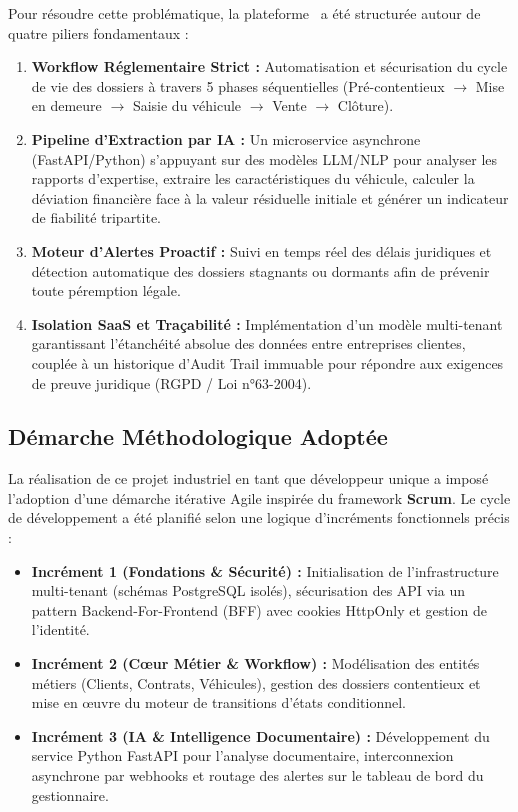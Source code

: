 Pour résoudre cette problématique, la plateforme \projectShortTitle\ a été structurée autour de quatre piliers fondamentaux :
\begin{enumerate}
    \item \textbf{Workflow Réglementaire Strict :} Automatisation et sécurisation du cycle de vie des dossiers à travers 5 phases séquentielles (Pré-contentieux $\rightarrow$ Mise en demeure $\rightarrow$ Saisie du véhicule $\rightarrow$ Vente $\rightarrow$ Clôture).
    \item \textbf{Pipeline d'Extraction par IA :} Un microservice asynchrone (FastAPI/Python) s'appuyant sur des modèles LLM/NLP pour analyser les rapports d'expertise, extraire les caractéristiques du véhicule, calculer la déviation financière face à la valeur résiduelle initiale et générer un indicateur de fiabilité tripartite.
    \item \textbf{Moteur d'Alertes Proactif :} Suivi en temps réel des délais juridiques et détection automatique des dossiers stagnants ou dormants afin de prévenir toute péremption légale.
    \item \textbf{Isolation SaaS et Traçabilité :} Implémentation d'un modèle multi-tenant garantissant l'étanchéité absolue des données entre entreprises clientes, couplée à un historique d'Audit Trail immuable pour répondre aux exigences de preuve juridique (RGPD / Loi n°63-2004).
\end{enumerate}

\subsection{Démarche Méthodologique Adoptée}

La réalisation de ce projet industriel en tant que développeur unique a imposé l'adoption d'une démarche itérative Agile inspirée du framework \textbf{Scrum}. Le cycle de développement a été planifié selon une logique d'incréments fonctionnels précis :
\begin{itemize}
    \item \textbf{Incrément 1 (Fondations \& Sécurité) :} Initialisation de l'infrastructure multi-tenant (schémas PostgreSQL isolés), sécurisation des API via un pattern Backend-For-Frontend (BFF) avec cookies HttpOnly et gestion de l'identité.
    \item \textbf{Incrément 2 (Cœur Métier \& Workflow) :} Modélisation des entités métiers (Clients, Contrats, Véhicules), gestion des dossiers contentieux et mise en œuvre du moteur de transitions d'états conditionnel.
    \item \textbf{Incrément 3 (IA \& Intelligence Documentaire) :} Développement du service Python FastAPI pour l'analyse documentaire, interconnexion asynchrone par webhooks et routage des alertes sur le tableau de bord du gestionnaire.
\end{itemize}

